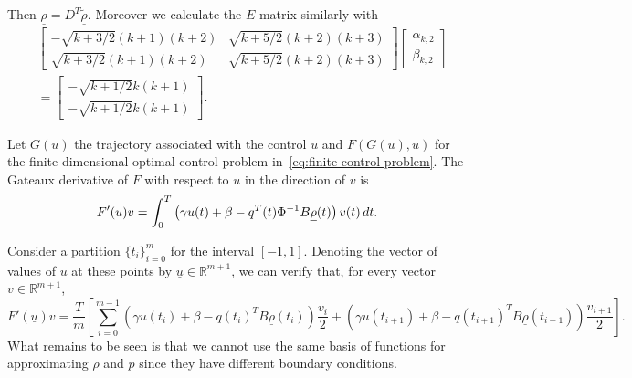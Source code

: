 \documentclass[12pt]{article}
\newcommand{\R}{\mathbb{R}}
\newcommand{\rhovec}{\underline{\rho}}
\theoremstyle{definition}
\begin{document}
Then $\rhovec = D^T\tilde{\rhovec}$. 
Moreover we calculate the $E$ matrix similarly with
\[
\begin{split}
    &\begin{bmatrix}
        -\sqrt{k + 3/2}(k+1)(k+2) & \sqrt{k + 5/2}(k+2)(k+3) \\
        \sqrt{k + 3/2}(k+1)(k+2) & \sqrt{k + 5/2}(k+2)(k+3)
    \end{bmatrix}\begin{bmatrix}
        \alpha_{k,2} \\ \beta_{k,2}
    \end{bmatrix} \\
    &= \begin{bmatrix}
        -\sqrt{k + 1/2}k(k+1) \\ -\sqrt{k + 1/2}k(k+1)
    \end{bmatrix}.
\end{split}
\]

Let $G(u)$ the trajectory associated with the control $u$ and $F(G(u), u)$ for the finite dimensional optimal control problem in~\eqref{eq:finite-control-problem}.
The Gateaux derivative of $F$ with respect to $u$ in the direction of $v$ is
\[
F'(u) v = \int_{0}^{T} \left(\gamma u(t) + \beta - q^T(t) \Phi^{-1} B \rhovec(t) \right) v(t) \, dt. \\
\]

Consider a partition ${\{t_i\}}_{i=0}^{m}$ for the interval $[-1,1]$. 
Denoting the vector of values of $u$ at these points by $\underline{u} \in \R^{m+1}$, we can verify that, for every vector $v \in \R^{m+1}$,
\[
F'(\underline{u}) v = \frac{T}{m}\left[\sum_{i=0}^{m-1} \left(\gamma u(t_i) + \beta - q{(t_i)}^T B \rhovec(t_i) \right) \frac{v_i}{2} + \left(\gamma u(t_{i+1}) + \beta - q{(t_{i+1})}^T B \rhovec(t_{i+1}) \right) \frac{v_{i+1}}{2}\right].
\]
What remains to be seen is that we cannot use the same basis of functions for approximating $\rho$ and $p$ since they have different boundary conditions.






\end{document}
